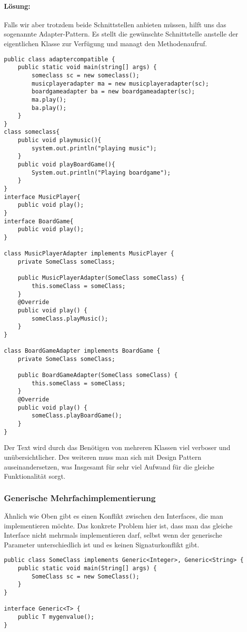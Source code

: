 \documentclass[a4paper, 1ppt]{article}
\begin{document}
\paragraph{Lösung:}
Falls wir aber trotzdem beide Schnittstellen anbieten müssen, hilft uns das sogenannte Adapter-Pattern\cite{websitedesignpatterns}.
Es stellt die gewünschte Schnittstelle anstelle der eigentlichen Klasse zur Verfügung und managt den Methodenaufruf.
\begin{verbatim}
public class adaptercompatible {
    public static void main(string[] args) {
        someclass sc = new someclass();
        musicplayeradapter ma = new musicplayeradapter(sc);
        boardgameadapter ba = new boardgameadapter(sc);
        ma.play();
        ba.play();
    }
}
class someclass{
    public void playmusic(){
        system.out.println("playing music");
    }
    public void playBoardGame(){
        System.out.println("Playing boardgame");
    }
}
interface MusicPlayer{
    public void play();
}
interface BoardGame{
    public void play();
}

class MusicPlayerAdapter implements MusicPlayer {
    private SomeClass someClass;
    
    public MusicPlayerAdapter(SomeClass someClass) {
        this.someClass = someClass;
    }
    @Override
    public void play() {
        someClass.playMusic();
    }
}

class BoardGameAdapter implements BoardGame {
    private SomeClass someClass;
    
    public BoardGameAdapter(SomeClass someClass) {
        this.someClass = someClass;
    }
    @Override
    public void play() {
        someClass.playBoardGame();
    }
}
\end{verbatim}
Der Text wird durch das Benötigen von mehreren Klassen viel verboser und unübersichtlicher. Des weiteren muss man sich mit Design Pattern auseinandersetzen, was Insgesamt für sehr viel Aufwand für die gleiche Funktionalität sorgt.
\subsubsection{Generische Mehrfachimplementierung}
Ähnlich wie Oben gibt es einen Konflikt zwischen den Interfaces, die man implementieren möchte.
Das konkrete Problem hier ist, dass man das gleiche Interface nicht mehrmals implementieren darf, selbst wenn der generische Parameter unterschiedlich ist und es keinen Signaturkonflikt gibt.
\begin{verbatim}
public class SomeClass implements Generic<Integer>, Generic<String> {
    public static void main(String[] args) {
        SomeClass sc = new SomeClass();
    }
}

interface Generic<T> {
    public T mygenvalue();
}
\end{verbatim}
\end{document}
